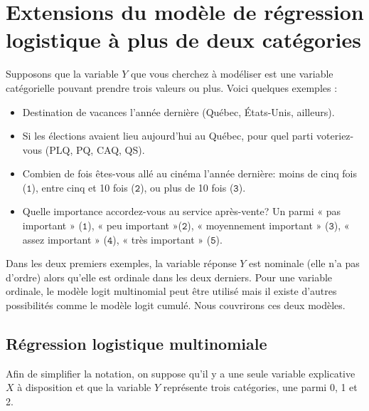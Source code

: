 \documentclass[
  11pt,
  letterpaper,
]{book}
\providecommand{\tightlist}{%
  \setlength{\itemsep}{0pt}\setlength{\parskip}{0pt}}
\theoremstyle{definition}
\theoremstyle{definition}
\theoremstyle{definition}
\theoremstyle{definition}
\theoremstyle{remark}
\begin{document}
\hypertarget{extensions-du-moduxe8le-de-ruxe9gression-logistique-uxe0-plus-de-deux-catuxe9gories}{%
\section{Extensions du modèle de régression logistique à plus de deux catégories}\label{extensions-du-moduxe8le-de-ruxe9gression-logistique-uxe0-plus-de-deux-catuxe9gories}}

Supposons que la variable \(Y\) que vous cherchez à modéliser est une variable catégorielle pouvant prendre trois valeurs ou plus. Voici quelques exemples :

\begin{itemize}
\tightlist
\item
  Destination de vacances l'année dernière (Québec, États-Unis, ailleurs).
\item
  Si les élections avaient lieu aujourd'hui au Québec, pour quel parti voteriez-vous (PLQ, PQ, CAQ, QS).
\item
  Combien de fois êtes-vous allé au cinéma l'année dernière: moins de cinq fois (\(\texttt{1}\)), entre cinq et 10 fois (\(\texttt{2}\)), ou plus de 10 fois (\(\texttt{3}\)).
\item
  Quelle importance accordez-vous au service après-vente? Un parmi « pas important » (\(\texttt{1}\)), « peu important »(\(\texttt{2}\)), « moyennement important » (\(\texttt{3}\)), « assez important » (\(\texttt{4}\)), « très important » (\(\texttt{5}\)).
\end{itemize}

Dans les deux premiers exemples, la variable réponse \(Y\) est nominale (elle n'a pas d'ordre) alors qu'elle est ordinale dans les deux derniers. Pour une variable ordinale, le modèle logit multinomial peut être utilisé mais il existe d'autres possibilités comme le modèle logit cumulé. Nous couvrirons ces deux modèles.

\hypertarget{ruxe9gression-logistique-multinomiale}{%
\subsection{Régression logistique multinomiale}\label{ruxe9gression-logistique-multinomiale}}

Afin de simplifier la notation, on suppose qu'il y a une seule variable explicative \(X\) à disposition et que la variable \(Y\) représente trois catégories, une parmi 0, 1 et 2.
\end{document}
